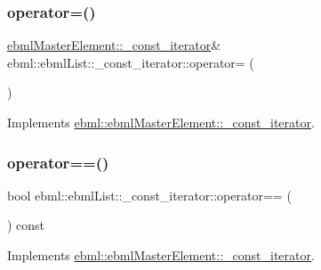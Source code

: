 \subsubsection{\texorpdfstring{operator=()}{operator=()}}
{\footnotesize\ttfamily \mbox{\hyperlink{classebml_1_1ebmlMasterElement_1_1__const__iterator}{ebml\+Master\+Element\+::\+\_\+const\+\_\+iterator}}\& ebml\+::ebml\+List\+::\+\_\+const\+\_\+iterator\+::operator= (\begin{DoxyParamCaption}\item[{const \mbox{\hyperlink{classebml_1_1ebmlMasterElement_1_1__const__iterator}{ebml\+Master\+Element\+::\+\_\+const\+\_\+iterator}} \&}]{ }\end{DoxyParamCaption})\hspace{0.3cm}{\ttfamily [virtual]}}



Implements \mbox{\hyperlink{classebml_1_1ebmlMasterElement_1_1__const__iterator_a102cf8b36c0d8184680ef15594bb59fb}{ebml\+::ebml\+Master\+Element\+::\+\_\+const\+\_\+iterator}}.

\mbox{\label{classebml_1_1ebmlList_1_1__const__iterator_af5249ca7b9ac67296b1e92ffa804bce5}} 
\subsubsection{\texorpdfstring{operator==()}{operator==()}}
{\footnotesize\ttfamily bool ebml\+::ebml\+List\+::\+\_\+const\+\_\+iterator\+::operator== (\begin{DoxyParamCaption}\item[{const \mbox{\hyperlink{classebml_1_1ebmlMasterElement_1_1__const__iterator}{ebml\+Master\+Element\+::\+\_\+const\+\_\+iterator}} \&}]{ }\end{DoxyParamCaption}) const\hspace{0.3cm}{\ttfamily [virtual]}}



Implements \mbox{\hyperlink{classebml_1_1ebmlMasterElement_1_1__const__iterator_a936395ed4c0c189a92927bfdf1e28586}{ebml\+::ebml\+Master\+Element\+::\+\_\+const\+\_\+iterator}}.



